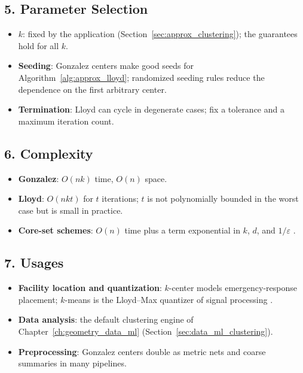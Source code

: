 \subsection{5. Parameter Selection}

\begin{itemize}
\item \textbf{$k$}: fixed by the application
  (Section~\ref{sec:approx_clustering}); the guarantees hold for all $k$.
\item \textbf{Seeding}: Gonzalez centers make good seeds for
  Algorithm~\ref{alg:approx_lloyd}; randomized seeding rules reduce the
  dependence on the first arbitrary center.
\item \textbf{Termination}: Lloyd can cycle in degenerate cases; fix a
  tolerance and a maximum iteration count.
\end{itemize}

\subsection{6. Complexity}

\begin{itemize}
\item \textbf{Gonzalez}: $O(nk)$ time, $O(n)$ space.
\item \textbf{Lloyd}: $O(nkt)$ for $t$ iterations; $t$ is not polynomially
  bounded in the worst case but is small in practice.
\item \textbf{Core-set schemes}: $O(n)$ time plus a term exponential in
  $k$, $d$, and $1/\varepsilon$ \cite{harpeled2004}.
\end{itemize}

\subsection{7. Usages}

\begin{itemize}
\item \textbf{Facility location and quantization}: $k$-center models
  emergency-response placement; $k$-means is the Lloyd--Max quantizer of
  signal processing \cite{lloyd1982}.
\item \textbf{Data analysis}: the default clustering engine of
  Chapter~\ref{ch:geometry_data_ml} (Section~\ref{sec:data_ml_clustering}).
\item \textbf{Preprocessing}: Gonzalez centers double as metric nets and
  coarse summaries in many pipelines.
\end{itemize}

